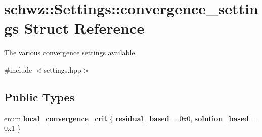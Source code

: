 \hypertarget{structschwz_1_1Settings_1_1convergence__settings}{}\section{schwz\+:\+:Settings\+:\+:convergence\+\_\+settings Struct Reference}
\label{structschwz_1_1Settings_1_1convergence__settings}


The various convergence settings available.  




{\ttfamily \#include $<$settings.\+hpp$>$}

\subsection*{Public Types}
\begin{DoxyCompactItemize}
\item 
\mbox{\label{structschwz_1_1Settings_1_1convergence__settings_a5de6ca46306037c5ca04d13e8757b749}} 
enum {\bfseries local\+\_\+convergence\+\_\+crit} \{ {\bfseries residual\+\_\+based} = 0x0, 
{\bfseries solution\+\_\+based} = 0x1
 \}
\end{DoxyCompactItemize}
